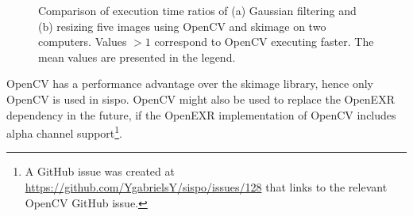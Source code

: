 \begin{figure}[htb]
\begin{subfigure}[b]{0.47\textwidth}
        \caption{}
        \label{fig:bm_comparison_res}
    \end{subfigure}
    \caption{Comparison of execution time ratios of (a) Gaussian filtering and (b) resizing five images using OpenCV and \gls{skimage} on two computers. Values $> 1$ correspond to OpenCV executing faster. The mean values are presented in the legend.}
    \label{fig:bm_comparison}
\end{figure}

OpenCV has a performance advantage over the \gls{skimage} library, hence only OpenCV is used in \gls{sispo}. OpenCV might also be used to replace the OpenEXR dependency in the future, if the OpenEXR implementation of OpenCV includes alpha channel support\footnote{A GitHub issue was created at \url{https://github.com/YgabrielsY/sispo/issues/128} that links to the relevant OpenCV GitHub issue.}.